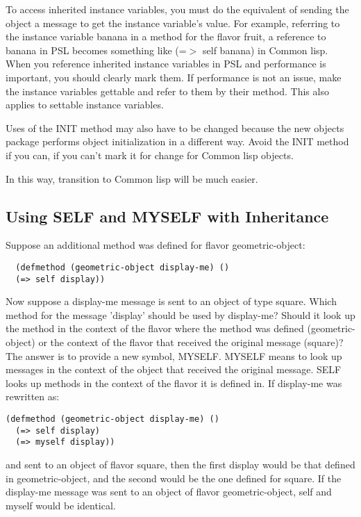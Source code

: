   To  access  inherited  instance  variables,  you  must  do the
equivalent of sending the object a message to get  the  instance
variable's  value.   For  example,  referring  to  the  instance
variable banana in a method for the flavor fruit,   a  reference
to  banana  in  PSL  becomes  something like (=$>$ self banana) in
Common lisp.  When you reference inherited instance variables in
PSL and performance is important, you should clearly mark  them.
If  performance  is  not  an issue,  make the instance variables
gettable and refer to them by their method.  This  also  applies
to settable instance variables.

  Uses  of  the  INIT method may also have to be changed because
the new objects package  performs  object  initialization  in  a
different way.  Avoid  the INIT method if you can,  if you can't
mark it for change for Common lisp objects.

  In this way, transition to Common lisp will be much easier.

\subsection{Using SELF and MYSELF with Inheritance}

  Suppose  an  additional  method   was   defined   for   flavor
geometric-object:

\begin{verbatim}
  (defmethod (geometric-object display-me) ()
  (=> self display))
\end{verbatim}
  Now  suppose a display-me message is sent to an object of type
square.  Which method for the message 'display' should  be  used
by  display-me?   Should it look up the method in the context of
the flavor where the method was  defined  (geometric-object)  or
the  context  of  the  flavor that received the original message
(square)? The answer is to provide a new symbol, MYSELF. MYSELF means
to look up messages in the context of the object that received
the original message. SELF looks up methods in the context of
the flavor it is defined in. If display-me was rewritten as:

\begin{verbatim}
(defmethod (geometric-object display-me) ()
  (=> self display)
  (=> myself display))
\end{verbatim}
and  sent  to an object of flavor square, then the first display
would be that defined in geometric-object, and the second  would
be  the  one  defined for square.  If the display-me message was
sent to an object of flavor geometric-object,  self  and  myself
would be identical.

